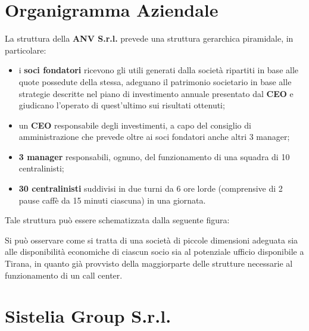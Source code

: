 \section[Organigramma Aziendale]{Organigramma Aziendale}
La struttura della\textbf{ \ac{ANV S.r.l.}} prevede una struttura gerarchica piramidale, in particolare:
\begin{itemize}

 	\item i \textbf{soci fondatori} ricevono gli utili generati dalla società ripartiti in base alle quote possedute della stessa, adeguano il patrimonio societario in base alle strategie descritte nel piano di investimento annuale presentato dal \textbf{\ac{CEO}} e giudicano l'operato di quest'ultimo sui risultati ottenuti; 
 	
	\item un \textbf{\ac{CEO}} responsabile degli investimenti, a capo del consiglio di amministrazione che prevede oltre ai soci fondatori anche altri 3 manager;
	
	\item \textbf{3 manager} responsabili, ognuno, del funzionamento di una squadra di 10 centralinisti;
	
	\item \textbf{30 centralinisti} suddivisi in due turni da 6 ore lorde (comprensive di 2 pause caffè da 15 minuti ciascuna) in una giornata. 

\end{itemize}  

Tale struttura può essere schematizzata dalla seguente figura:
\newline


Si può osservare come si tratta di una società di piccole dimensioni adeguata sia alle disponibilità economiche di ciascun socio sia al potenziale ufficio disponibile a Tirana, in quanto già provvisto della maggiorparte delle strutture necessarie al funzionamento di un call center.

\section[Sistelia Group S.r.l.]{Sistelia Group S.r.l.}

